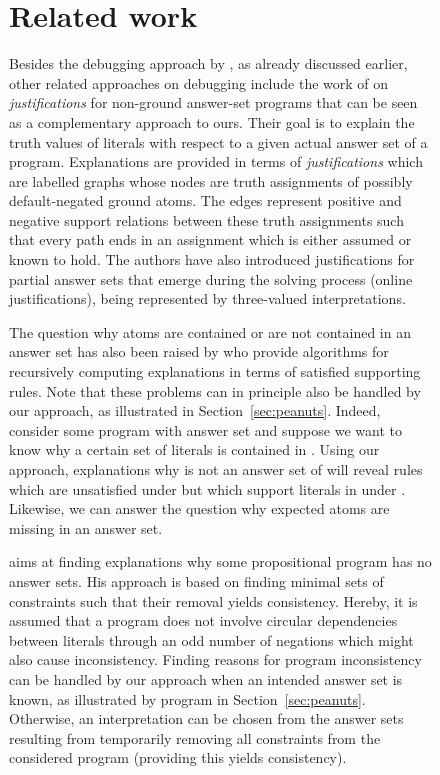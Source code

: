 \documentclass{tlp}
\begin{document}
\begin{figure}[t]
\begin{small}
\section{Related work}

Besides the debugging approach by , as already discussed earlier, other related approaches on debugging include the work of  \citeyear{pontelli09} on \emph{justifications} for non-ground answer-set programs that can be seen as a complementary approach to ours.
Their goal is to explain the truth values of literals with respect to a given actual answer set of a program.
Explanations are provided in terms of \emph{justifications} which are labelled graphs
whose nodes are truth assignments of possibly default-negated ground atoms.
The edges represent positive and negative support relations between these truth assignments such that every path ends in an assignment which is either assumed or known to hold.
The authors have also introduced justifications for partial answer sets that emerge during the solving process (online justifications), being represented by three-valued interpretations.

The question why atoms are contained or are not contained in an answer set has also been raised by  \citeyear{brain05} who provide algorithms for recursively computing explanations in terms of satisfied supporting rules.
Note that these problems can in principle also be handled by our approach, as illustrated in Section~\ref{sec:peanuts}.
Indeed, consider some program  with answer set  and suppose we want to know why a certain set  of literals is contained in .
Using our approach, explanations why  is not an answer set of  will reveal rules which are unsatisfied under  but which support literals in  under .
Likewise, we can answer the question why expected atoms are missing in an answer set. 

 aims at finding explanations why some propositional program has no answer sets. 
His approach is based on finding minimal sets of constraints such that their removal yields consistency.
Hereby, it is assumed that a program does not involve circular dependencies
between literals through an odd number of negations which might also cause inconsistency.
Finding reasons for program inconsistency can be  handled by our approach when an intended answer set is known, as illustrated by program  in Section~\ref{sec:peanuts}.
Otherwise, an interpretation can be chosen from the answer sets resulting from temporarily removing all constraints from the considered program (providing this yields consistency). 



\end{small}
\end{figure}
\end{document}
